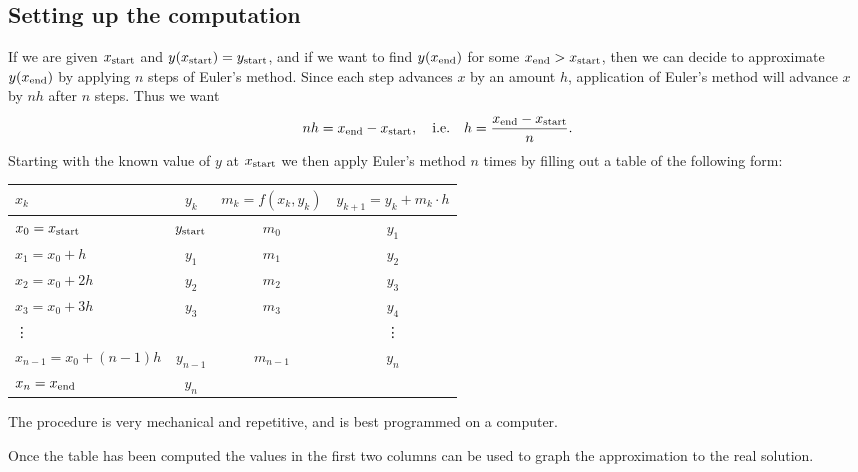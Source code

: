 \subsection{Setting up the computation} %
\label{sec:euler-how-organize}
If we are given $x_{\rm start}$ and $y(x_{\rm start}) = y_{\rm start}$, and if we
want to find $y(x_{\rm end})$ for some $x_{\rm end}>x_{\rm start}$, then we can
decide to approximate $y(x_{\rm end})$ by applying $n$ steps of Euler's method.
Since each step advances $x$ by an amount $h$, application of Euler's method will
advance $x$ by $nh$ after $n$ steps.  Thus we want
\[
nh = x_{\rm end}-x_{\rm start}, \quad \text{i.e.} \quad
h = \frac{x_{\rm end} - x_{\rm start}} {n}.
\]
Starting with the known value of $y$ at $x_{\rm start}$ we then apply Euler's method
$n$ times by filling out a table of the following form:

\medskip
\begin{center}
  \begin{tabular}{lccc}
    \toprule
    $x_k$ & $y_k$ & $m_k = f(x_k,y_k)$ & $y_{k+1} = y_k+m_k\cdot h$\\
    \midrule
    $x_0=x_{\rm start}$ & $y_{\rm start}$ & $m_0$ & $y_1$ \\
    $x_1=x_0+ h$ & $y_1$ & $m_1$ & $y_2$\\
    $x_2=x_0+2h$ & $y_2$ & $m_2$ &$y_3$\\
    $x_3=x_0+3h$ & $y_3$ & $m_3$ &$y_4$\\
    \vdots &&& \vdots \\
    $x_{n-1}=x_0+(n-1)h$ & $y_{n-1}$ & $m_{n-1}$ & $y_n$\\
    $x_n = x_{\rm end}$ & $y_n$ &  &\\
    \bottomrule
  \end{tabular}
\end{center}
\medskip

The procedure is very mechanical and repetitive, and is best programmed on a
computer.

Once the table has been computed the values in the first two columns can be used to
graph the approximation to the real solution.

